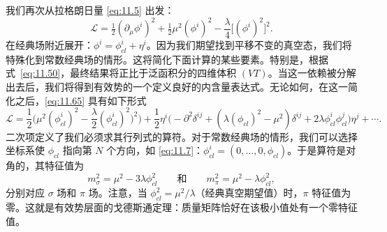 我们再次从拉格朗日量 \eqref{eq:11.5} 出发：
\begin{equation}
  \mathcal{L} = \tfrac{1}{2}(\partial_\mu\phi^i)^2 + \tfrac{1}{2}\mu^2
    (\phi^i)^2 - \frac{\lambda}{4}\bigl[ (\phi^i)^2 \bigr]^2 .
  \label{eq:11.65}
\end{equation}
在经典场附近展开：$\phi^i = \phi^i_{cl} + \eta^i$。因为我们期望找到平移不变的真空态，我们将特殊化到常数经典场的情形。这将简化下面计算的某些要素。特别是，根据式~\eqref{eq:11.50}，最终结果将正比于泛函积分的四维体积 $(VT)$。当这一依赖被分解出去后，我们将得到有效势的一个定义良好的内含量表达式。无论如何，在这一简化之后，\eqref{eq:11.65} 具有如下形式
\begin{equation}
  \mathcal{L} = \frac{1}{2}\bigl( \mu^2(\phi^i_{cl})^2
    - \frac{\lambda}{2}(\phi^i_{cl})^2)^2 \bigr)
    + \frac{1}{2}\eta^i\bigl( -\partial^2\delta^{ij} + (\lambda(\phi_{cl})^2
      - \mu^2)\delta^{ij} + 2\lambda\phi^i_{cl}\phi^j_{cl} \bigr)\eta^j
    + \cdots .
  \label{eq:11.66}
\end{equation}
二次项定义了我们必须求其行列式的算符。对于常数经典场的情形，我们可以选择坐标系使 $\phi_{cl}$ 指向第 $N$ 个方向，如 \eqref{eq:11.7}：$\phi^i_{cl} = (0, \ldots, 0, \phi_{cl})$。于是算符是对角的，其特征值为
\begin{equation}
  m^2_\sigma = \mu^2 - 3\lambda\phi_{cl}^2
  \qquad\text{和}\qquad
  m^2_\pi = \mu^2 - \lambda\phi_{cl}^2 ,
  \label{eq:11.69}
\end{equation}
分别对应 $\sigma$ 场和 $\pi$ 场。注意，当 $\phi_{cl}^2 = \mu^2/\lambda$（经典真空期望值）时，$\pi$ 特征值为零。这就是有效势层面的戈德斯通定理：质量矩阵恰好在该极小值处有一个零特征值。

